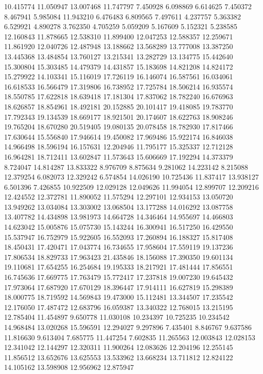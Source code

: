 10.415774
11.050947
13.007468
11.747797
7.450928
6.098869
6.614625
7.450372
8.467941
5.985084
11.943210
6.476483
6.809565
7.497611
4.237757
5.363382
6.529921
4.890278
3.762350
4.705259
5.059209
5.167609
5.152321
5.238585
12.160843
11.878665
12.538310
11.899400
12.047253
12.588357
12.259671
11.861920
12.040726
12.487948
13.188662
13.568289
13.777008
13.387250
13.445368
13.484854
13.760127
13.215341
13.282729
13.134775
15.442640
15.300804
15.303485
14.479379
14.431857
15.183698
14.821208
14.824172
15.279922
14.103341
15.116019
17.726119
16.146074
16.587561
16.034061
16.618533
16.566479
17.319806
16.738952
17.725784
18.506214
16.935574
18.550785
17.622818
18.639418
17.181304
17.837062
18.782240
16.676963
18.626857
18.854961
18.492181
20.152885
20.101417
19.418085
19.783770
17.792343
19.134539
18.669177
18.921501
20.174607
18.622763
18.908246
19.765204
18.670280
20.519405
19.080135
20.078458
18.782930
17.817466
17.630644
15.556840
17.946614
19.450082
17.969486
15.922174
16.846038
14.966498
18.596194
16.157631
12.204946
11.795177
15.325337
12.712128
16.964281
18.712411
13.602847
11.573643
15.606669
17.192294
14.373379
8.724047
14.814287
13.833322
8.976709
8.875634
9.281062
14.223142
8.215088
12.379254
6.082073
12.329242
6.574854
14.026190
10.725436
11.837417
13.938127
6.501396
7.426855
10.922509
12.029128
12.049626
11.994054
12.899707
12.209216
12.424552
12.372781
11.890052
11.575294
12.297101
12.934153
13.050720
13.949262
13.034084
13.303002
13.068504
13.177288
14.016292
13.087758
13.407782
14.434898
13.981973
14.664728
14.346464
14.955697
14.466803
14.623042
15.005876
15.075730
15.143244
16.300941
16.517250
16.429550
15.537947
16.752979
15.922605
16.552093
17.260894
16.188327
15.817408
18.450431
17.420471
17.043774
16.734655
17.958604
17.559119
19.137236
17.806534
18.829733
17.963423
21.435846
18.156088
17.390350
19.601134
19.110681
17.654255
16.254684
19.195333
18.217921
17.481444
17.856551
16.745636
17.669775
17.763479
15.772417
17.237818
19.007230
19.645432
17.973064
17.687920
17.670129
18.396447
17.914111
16.627819
15.298389
18.000775
18.719592
14.569843
19.473000
15.112481
13.344507
17.235542
12.176050
17.487472
12.683796
16.059387
13.340322
12.768015
13.215195
12.785404
11.454897
9.650778
11.030108
10.234397
10.725235
10.234542
14.968484
13.020268
15.596591
12.294027
9.297896
7.435401
8.846767
9.637586
11.816630
9.613404
7.685775
11.447254
7.602835
11.265563
12.003843
12.028153
12.341042
12.144297
12.320311
11.900264
12.083626
12.204196
12.255145
11.856512
13.652676
13.625553
13.533962
13.668234
13.711812
12.824122
14.105162
13.598908
12.956962
12.875947
